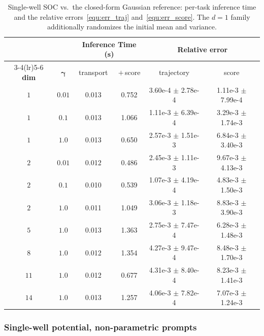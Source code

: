 \documentclass[preprint]{elsarticle}
\newcommand{\g}{\gamma}
\begin{document}
\begin{table}[!htpb]
    \centering
    \caption{Single-well SOC vs.\ the closed-form Gaussian reference: per-task
    inference time and the relative errors~\eqref{equ:err_traj}
    and~\eqref{equ:err_score}. The $d=1$ family additionally
    randomizes the initial mean and variance.
    }
    \label{tab:soc_error_comparison}
    \begin{tabular}{cccccc}
        \toprule
         &  & \multicolumn{2}{c}{\textbf{Inference Time (s)}}
            & \multicolumn{2}{c}{\textbf{Relative error}} \\
        \cmidrule(lr){3-4}\cmidrule(lr){5-6}
        \textbf{dim} & $\boldsymbol{\g}$ & transport & $+$\,score
            & trajectory & score \\
        \midrule
        $1$  & $0.01$ & 0.013 & 0.752 & 3.60e-4 $\pm$ 2.78e-4 & 1.11e-3 $\pm$ 7.99e-4 \\
        $1$  & $0.1$  & 0.013 & 1.066 & 1.11e-3 $\pm$ 6.39e-4 & 3.29e-3 $\pm$ 1.74e-3 \\
        $1$  & $1.0$  & 0.013 & 0.650 & 2.57e-3 $\pm$ 1.51e-3 & 6.84e-3 $\pm$ 3.40e-3 \\
        \midrule
        $2$  & $0.01$ & 0.012 & 0.486 & 2.45e-3 $\pm$ 1.11e-3 & 9.67e-3 $\pm$ 4.13e-3 \\
        $2$  & $0.1$  & 0.010 & 0.539 & 1.07e-3 $\pm$ 4.19e-4 & 4.83e-3 $\pm$ 1.50e-3 \\
        $2$  & $1.0$  & 0.011 & 1.049 & 3.06e-3 $\pm$ 1.18e-3 & 8.83e-3 $\pm$ 3.90e-3 \\
        \midrule
        $5$  & $1.0$  & 0.013 & 1.363 & 2.75e-3 $\pm$ 7.47e-4 & 6.28e-3 $\pm$ 1.48e-3 \\
        $8$  & $1.0$  & 0.012 & 1.354 & 4.27e-3 $\pm$ 9.47e-4 & 8.48e-3 $\pm$ 1.70e-3 \\
        $11$ & $1.0$  & 0.012 & 0.677 & 4.31e-3 $\pm$ 8.40e-4 & 8.23e-3 $\pm$ 1.41e-3 \\
        $14$ & $1.0$  & 0.013 & 1.257 & 4.06e-3 $\pm$ 7.82e-4 & 7.07e-3 $\pm$ 1.24e-3 \\
        \bottomrule
    \end{tabular}
\end{table}

\subsubsection{Single-well potential, non-parametric prompts}
\label{sec:exp_nonparam}
\end{document}
